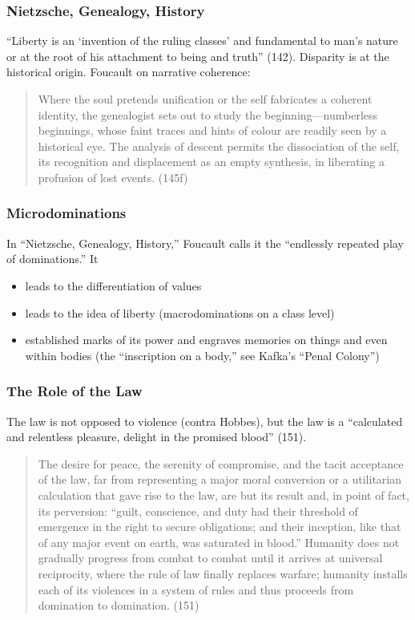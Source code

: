 \documentclass[xcolor=dvipsnames]{beamer}
\begin{document}
\begin{frame}
  \frametitle{Nietzsche, Genealogy, History}
  ``Liberty is an `invention of the ruling classes' and fundamental to
  man's nature or at the root of his attachment to being and truth''
  (142). Disparity is at the historical origin. Foucault on
  narrative coherence:
  \begin{quote}
    Where the soul pretends unification or the self fabricates a
    coherent identity, the genealogist sets out to study the
    beginning---numberless beginnings, whose faint traces and hints of
    colour are readily seen by a historical eye. The analysis of
    descent permits the dissociation of the self, its recognition and
    displacement as an empty synthesis, in liberating a profusion of
    lost events. (145f)
  \end{quote}
\end{frame}

\begin{frame}
  \frametitle{Microdominations}
  In ``Nietzsche, Genealogy, History,'' Foucault calls it the
  ``endlessly repeated play of dominations.'' It 
  \begin{itemize}
  \item leads to the differentiation of values
  \item leads to the idea of liberty (macrodominations on a class level)
  \item established marks of its power and engraves memories on things
    and even within bodies (the ``inscription on a body,'' see Kafka's
    ``Penal Colony'')
  \end{itemize}
\end{frame}

\begin{frame}
  \frametitle{The Role of the Law}
  The law is not opposed to violence (contra Hobbes), but the law is a
  ``calculated and relentless pleasure, delight in the promised
  blood'' (151).
  \begin{quote}
    The desire for peace, the serenity of compromise, and the tacit
    acceptance of the law, far from representing a major moral
    conversion or a utilitarian calculation that gave rise to the law,
    are but its result and, in point of fact, its perversion: ``guilt,
    conscience, and duty had their threshold of emergence in the right
    to secure obligations; and their inception, like that of any major
    event on earth, was saturated in blood.'' Humanity does not
    gradually progress from combat to combat until it arrives at
    universal reciprocity, where the rule of law finally replaces
    warfare; humanity installs each of its violences in a system of
    rules and thus proceeds from domination to domination. (151)
  \end{quote}
\end{frame}
\end{document}
